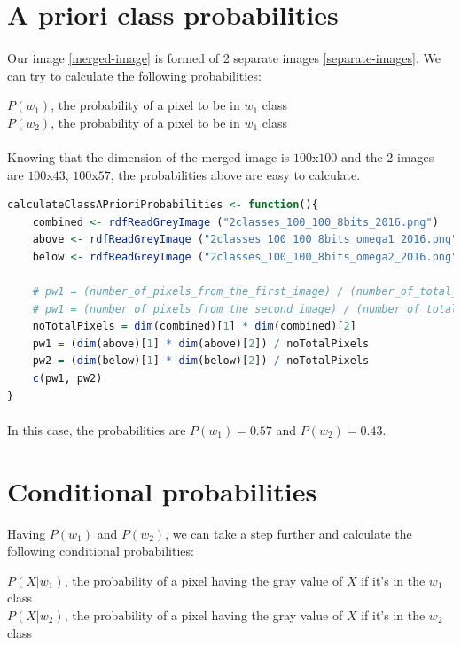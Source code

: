 \section{A priori class probabilities}
\paragraph{}
Our image \ref{merged-image} is formed of 2 separate images \ref{separate-images}.
We can try to calculate the following probabilities:
\begin{center}
    $P(w_1)$, the probability of a pixel to be in $w_1$ class
    \\
    $P(w_2)$, the probability of a pixel to be in $w_1$ class
\end{center}

\paragraph{}
Knowing that the dimension of the merged image is $100$x$100$ and the 2 images are $100$x$43$, $100$x$57$, the probabilities above are easy to calculate.

\begin{lstlisting}[language=R, caption=A priori class probabilities]
    calculateClassAPrioriProbabilities <- function(){
    combined <- rdfReadGreyImage ("2classes_100_100_8bits_2016.png")
    above <- rdfReadGreyImage ("2classes_100_100_8bits_omega1_2016.png")
    below <- rdfReadGreyImage ("2classes_100_100_8bits_omega2_2016.png")
    
    # pw1 = (number_of_pixels_from_the_first_image) / (number_of_total_pixels)
    # pw1 = (number_of_pixels_from_the_second_image) / (number_of_total_pixels)
    noTotalPixels = dim(combined)[1] * dim(combined)[2]
    pw1 = (dim(above)[1] * dim(above)[2]) / noTotalPixels
    pw2 = (dim(below)[1] * dim(below)[2]) / noTotalPixels
    c(pw1, pw2)
}
\end{lstlisting}

\paragraph{}
In this case, the probabilities are $P(w_1) = 0.57$ and $P(w_2) = 0.43$.

\clearpage

\section{Conditional probabilities}
Having $P(w_1)$ and $P(w_2)$, we can take a step further and calculate the following conditional probabilities:
\begin{center}
    $P(X|w_1)$, the probability of a pixel having the gray value of $X$ if it's in the $w_1$ class
    \\
    $P(X|w_2)$, the probability of a pixel having the gray value of $X$ if it's in the $w_2$ class
\end{center}

